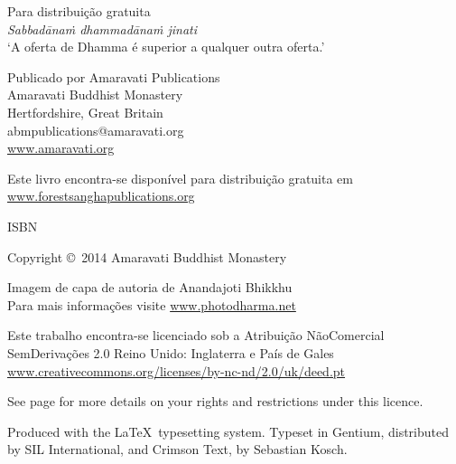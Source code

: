\cleartoverso

\thispagestyle{empty}

{\small\setlength{\parskip}{0.8em}\setlength{\parindent}{0em}%
{\raggedright%

\thetitle

Para distribuição gratuita\\
\emph{Sabbadānaṁ dhammadānaṁ jinati}\\
‘A oferta de Dhamma é superior a qualquer outra oferta.’

Publicado por Amaravati Publications\\
Amaravati Buddhist Monastery\\
Hertfordshire, Great Britain\\
abmpublications@amaravati.org\\
\href{http://amaravati.org}{www.amaravati.org}

Este livro encontra-se disponível para distribuição gratuita em\\
\href{http://forestsanghapublications.org/}{www.forestsanghapublications.org}

ISBN \theISBN

Copyright \copyright\ 2014 Amaravati Buddhist Monastery

Imagem de capa de autoria de Anandajoti Bhikkhu\\
Para mais informações visite \href{http://www.photodharma.net/}{www.photodharma.net}

\vfill

{%

Este trabalho encontra-se licenciado sob a
Atribuição NãoComercial\\ SemDerivações 2.0 Reino Unido: Inglaterra e País de Gales\\
\href{http://creativecommons.org/licenses/by-nc-nd/2.0/uk/deed.pt}{www.creativecommons.org/licenses/by-nc-nd/2.0/uk/deed.pt}

See page \pageref{copyright-details} for more details on your rights and restrictions under this licence.

Produced with the \LaTeX\ typesetting system. Typeset in Gentium, distributed by SIL International, and Crimson Text, by Sebastian Kosch.

\theEditionInfo

}

}}

